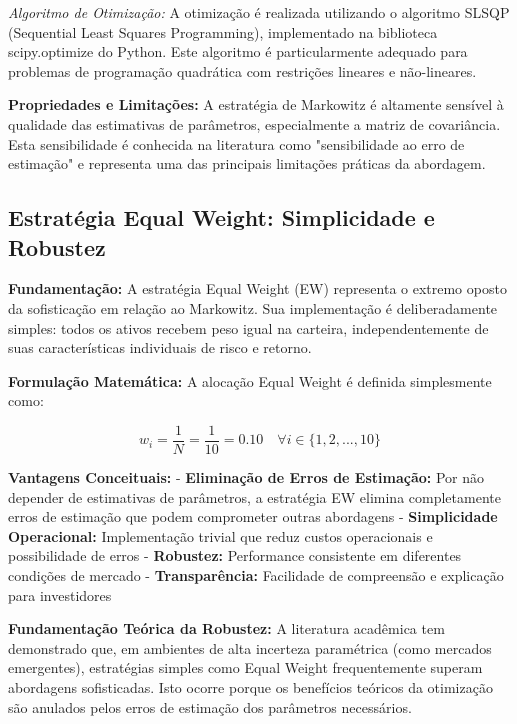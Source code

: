 \textit{Algoritmo de Otimização:} A otimização é realizada utilizando o algoritmo SLSQP (Sequential Least Squares Programming), implementado na biblioteca scipy.optimize do Python. Este algoritmo é particularmente adequado para problemas de programação quadrática com restrições lineares e não-lineares.

\textbf{Propriedades e Limitações:} A estratégia de Markowitz é altamente sensível à qualidade das estimativas de parâmetros, especialmente a matriz de covariância. Esta sensibilidade é conhecida na literatura como "sensibilidade ao erro de estimação" e representa uma das principais limitações práticas da abordagem.

\subsection{Estratégia Equal Weight: Simplicidade e Robustez}

\textbf{Fundamentação:} A estratégia Equal Weight (EW) representa o extremo oposto da sofisticação em relação ao Markowitz. Sua implementação é deliberadamente simples: todos os ativos recebem peso igual na carteira, independentemente de suas características individuais de risco e retorno.

\textbf{Formulação Matemática:} A alocação Equal Weight é definida simplesmente como:

\begin{equation}
w_i = \frac{1}{N} = \frac{1}{10} = 0.10 \quad \forall i \in \{1, 2, ..., 10\}
\end{equation}

\textbf{Vantagens Conceituais:}
- \textbf{Eliminação de Erros de Estimação:} Por não depender de estimativas de parâmetros, a estratégia EW elimina completamente erros de estimação que podem comprometer outras abordagens
- \textbf{Simplicidade Operacional:} Implementação trivial que reduz custos operacionais e possibilidade de erros
- \textbf{Robustez:} Performance consistente em diferentes condições de mercado
- \textbf{Transparência:} Facilidade de compreensão e explicação para investidores

\textbf{Fundamentação Teórica da Robustez:} A literatura acadêmica tem demonstrado que, em ambientes de alta incerteza paramétrica (como mercados emergentes), estratégias simples como Equal Weight frequentemente superam abordagens sofisticadas. Isto ocorre porque os benefícios teóricos da otimização são anulados pelos erros de estimação dos parâmetros necessários.

